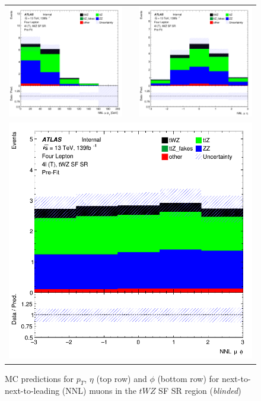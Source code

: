 \begin{figure}[htbp]
\centering
  \begin{tabular}{ccc}



    \includegraphics[width=.2\textwidth]{figures/PreFitPlots/lep4_tWZ_4T_SF_NNL_mu_pt} & &
    \includegraphics[width=.2\textwidth]{figures/PreFitPlots/lep4_tWZ_4T_SF_NNL_mu_eta}  \\
    \multicolumn{3}{c}{\includegraphics[width=.2\textwidth]{figures/PreFitPlots/lep4_tWZ_4T_SF_NNL_mu_phi}}  \\
  \end{tabular}
    \caption{MC predictions for $p_{T}$, $\eta$ (top row) and $\phi$ (bottom row) for next-to-next-to-leading (NNL) muons in the $tWZ$ SF SR region (\textit{blinded})}
  \label{fig:4lep-SF-SR-muonPlots}
\end{figure}

